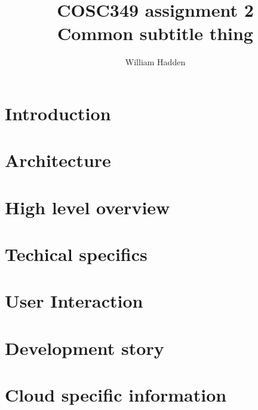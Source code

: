 \documentclass[12pt]{article}
\begin{document}
\title{COSC349 assignment 2 \\
\large Common subtitle thing 
}

\author{William Hadden} 

\maketitle

\section*{Introduction}

\section*{Architecture}
\section{High level overview}

\section{Techical specifics}

\section*{User Interaction}

\section*{Development story}

\section*{Cloud specific information}



\end{document}
